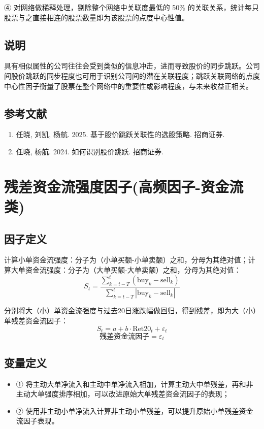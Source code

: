 \documentclass{article}
\begin{document}
④ 对网络做稀释处理，剔除整个网络中关联度最低的 50\% 的关联关系，统计每只股票与之直接相连的股票数量即为该股票的点度中心性值。

\subsection{说明}
具有相似属性的公司往往会受到类似的信息冲击，进而导致股价的同步跳跃。公司间股价跳跃的同步程度也可用于识别公司间的潜在关联程度；跳跃关联网络的点度中心性因子衡量了股票在整个网络中的重要性或影响程度，与未来收益正相关。

\subsection{参考文献}
\begin{enumerate}
    \item 任晓, 刘凯, 杨航. 2025. 基于股价跳跃关联性的选股策略. 招商证券.
    \item 任晓, 杨航. 2024. 如何识别股价跳跃. 招商证券.
\end{enumerate}

\section{残差资金流强度因子(高频因子-资金流类)}

\subsection{因子定义}

计算小单资金流强度：分子为（小单买额-小单卖额）之和，分母为其绝对值；计算大单资金流强度：分子为（大单买额-大单卖额）之和，分母为其绝对值：
\begin{equation}
    S_t = \frac{\sum_{k=t-T}^{t} (\mathrm{buy}_k - \mathrm{sell}_k)}{\sum_{k=t-T}^{t} |\mathrm{buy}_k - \mathrm{sell}_k|}
\end{equation}

分别将大（小）单资金流强度与过去20日涨跌幅做回归，得到残差，即为大（小）单残差资金流因子：
\begin{equation}
    S_t = a + b \cdot \mathrm{Ret20}_t + \varepsilon_t
\end{equation}
\begin{equation}
    \text{残差资金流因子} = \varepsilon_t
\end{equation}

\subsection{变量定义}
\begin{itemize}
    \item ① 将主动大单净流入和主动中单净流入相加，计算主动大中单残差，再和非主动大单强度排序相加，可以改进原始大单残差资金流因子的表现；
    \item ② 使用非主动小单净流入计算非主动小单残差，可以提升原始小单残差资金流因子表现。
\end{itemize}
\end{document}
